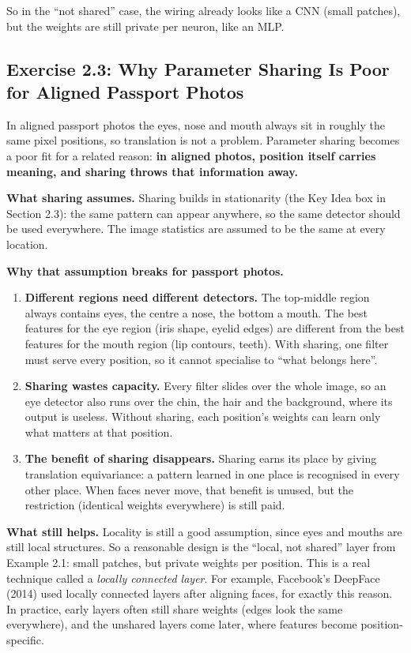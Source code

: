 So in the ``not shared'' case, the wiring already looks like a CNN (small patches), but the weights are still private per neuron, like an MLP.

\subsection*{Exercise 2.3: Why Parameter Sharing Is Poor for Aligned Passport Photos}

In aligned passport photos the eyes, nose and mouth always sit in roughly the same pixel positions, so translation is not a problem. Parameter sharing becomes a poor fit for a related reason: \textbf{in aligned photos, position itself carries meaning, and sharing throws that information away.}

\textbf{What sharing assumes.} Sharing builds in stationarity (the Key Idea box in Section 2.3): the same pattern can appear anywhere, so the same detector should be used everywhere. The image statistics are assumed to be the same at every location.

\textbf{Why that assumption breaks for passport photos.}
\begin{enumerate}[leftmargin=*]
  \item \textbf{Different regions need different detectors.} The top-middle region always contains eyes, the centre a nose, the bottom a mouth. The best features for the eye region (iris shape, eyelid edges) are different from the best features for the mouth region (lip contours, teeth). With sharing, one filter must serve every position, so it cannot specialise to ``what belongs here''.
  \item \textbf{Sharing wastes capacity.} Every filter slides over the whole image, so an eye detector also runs over the chin, the hair and the background, where its output is useless. Without sharing, each position's weights can learn only what matters at that position.
  \item \textbf{The benefit of sharing disappears.} Sharing earns its place by giving translation equivariance: a pattern learned in one place is recognised in every other place. When faces never move, that benefit is unused, but the restriction (identical weights everywhere) is still paid.
\end{enumerate}

\textbf{What still helps.} Locality is still a good assumption, since eyes and mouths are still local structures. So a reasonable design is the ``local, not shared'' layer from Example 2.1: small patches, but private weights per position. This is a real technique called a \emph{locally connected layer}. For example, Facebook's DeepFace (2014) used locally connected layers after aligning faces, for exactly this reason. In practice, early layers often still share weights (edges look the same everywhere), and the unshared layers come later, where features become position-specific.

